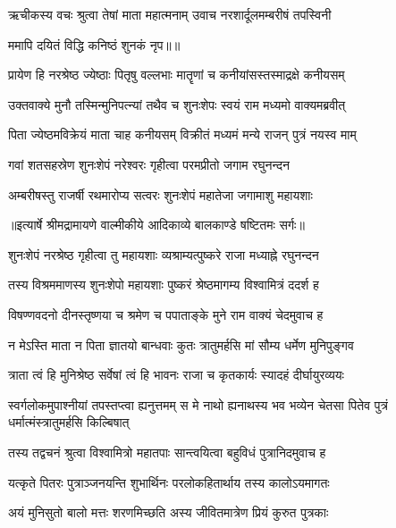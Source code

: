 \twolineshloka
{ऋचीकस्य वचः श्रुत्वा तेषां माता महात्मनाम्}
{उवाच नरशार्दूलमम्बरीषं तपस्विनी} %

{ममापि दयितं विद्धि कनिष्ठं शुनकं नृप॥॥} %

\addtocounter{shlokacount}{1}

\twolineshloka
{प्रायेण हि नरश्रेष्ठ ज्येष्ठाः पितृषु वल्लभाः}
{मातॄणां च कनीयांसस्तस्माद्रक्षे कनीयसम्} %

\twolineshloka
{उक्तवाक्ये मुनौ तस्मिन्मुनिपत्न्यां तथैव च}
{शुनःशेपः स्वयं राम मध्यमो वाक्यमब्रवीत्} %

\twolineshloka
{पिता ज्येष्ठमविक्रेयं माता चाह कनीयसम्}
{विक्रीतं मध्यमं मन्ये राजन् पुत्रं नयस्व माम्} %

\twolineshloka
{गवां शतसहस्रेण शुनःशेपं नरेश्वरः}
{गृहीत्वा परमप्रीतो जगाम रघुनन्दन} %

\twolineshloka
{अम्बरीषस्तु राजर्षी रथमारोप्य सत्वरः}
{शुनःशेपं महातेजा जगामाशु महायशाः} %


{॥इत्यार्षे श्रीमद्रामायणे वाल्मीकीये आदिकाव्ये बालकाण्डे षष्टितमः सर्गः॥}


\twolineshloka
{शुनःशेपं नरश्रेष्ठ गृहीत्वा तु महायशाः}
{व्यश्राम्यत्पुष्करे राजा मध्याह्ने रघुनन्दन} %

\twolineshloka
{तस्य विश्रममाणस्य शुनःशेपो महायशाः}
{पुष्करं श्रेष्ठमागम्य विश्वामित्रं ददर्श ह} %

\twolineshloka
{विषण्णवदनो दीनस्तृष्णया च श्रमेण च}
{पपाताङ्के मुने राम वाक्यं चेदमुवाच ह} %

\twolineshloka
{न मेऽस्ति माता न पिता ज्ञातयो बान्धवाः कुतः}
{त्रातुमर्हसि मां सौम्य धर्मेण मुनिपुङ्गव} %

\twolineshloka
{त्राता त्वं हि मुनिश्रेष्ठ सर्वेषां त्वं हि भावनः}
{राजा च कृतकार्यः स्यादहं दीर्घायुरव्ययः} %

\threelineshloka
{स्वर्गलोकमुपाश्नीयां तपस्तप्त्वा ह्यनुत्तमम्}
{स मे नाथो ह्यनाथस्य भव भव्येन चेतसा}
{पितेव पुत्रं धर्मात्मंस्त्रातुमर्हसि किल्बिषात्} %

\twolineshloka
{तस्य तद्वचनं श्रुत्वा विश्वामित्रो महातपाः}
{सान्त्वयित्वा बहुविधं पुत्रानिदमुवाच ह} %

\twolineshloka
{यत्कृते पितरः पुत्राञ्जनयन्ति शुभार्थिनः}
{परलोकहितार्थाय तस्य कालोऽयमागतः} %

\twolineshloka
{अयं मुनिसुतो बालो मत्तः शरणमिच्छति}
{अस्य जीवितमात्रेण प्रियं कुरुत पुत्रकाः} %

